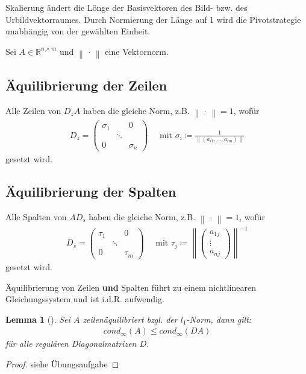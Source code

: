 \documentclass[ngerman,fontsize=11pt, paper=a4, parskip=half, titlepage=true, toc=bib]{scrbook}
\theoremstyle{definition}
\theoremstyle{plain}
\newtheorem{Lem}[Def]{Lemma}		%
\newcommand{\Renm}{\mathds{R}^{n\times m}}
\newcommand{\nn}[1]{\left\| #1 \right\|}
\newcommand{\subsectione}[1]{\subsection{#1} \addtocounter{Def}{1}}
\newenvironment{Leme}[1][]{ %
	\begin{Lem}[#1]
	}
	{
	\end{Lem}
	\addtocounter{subsection}{1}
}
\begin{document}
  Skalierung ändert die Lönge der Basisvektoren des Bild- bzw. des Urbildvektorraumes.
  Durch Normierung der Länge auf 1 wird die Pivotstrategie unabhängig von der 
  gewählten Einheit.
  
  Sei $A\in\Renm $ und $\nn{\,\cdot\,} $ eine Vektornorm.
  
  
  \subsectione{Äquilibrierung der Zeilen} 
  Alle Zeilen von $D_zA$ haben die gleiche Norm, z.B. $\nn{\,\cdot\,} =1$, wofür 
  \begin{gather}
    D_z = \begin{pmatrix}
      \sigma_1 & & 0 \\
      &\ddots & \\ 
      0 && \sigma_n
    \end{pmatrix}
    \quad \text{ mit }\sigma_i\coloneqq \frac{1}{\nn{(a_{i1}, \dots , a_{im})}}
    \label{IV.1.1}
  \end{gather}
  gesetzt wird.


\subsectione{Äquilibrierung der Spalten} 
  Alle Spalten von $AD_s$ haben die gleiche Norm, z.B. $\nn{\,\cdot\,} =1$, wofür 
  \begin{gather}
    D_s = \begin{pmatrix}
      \tau_1 & & 0 \\
      &\ddots & \\ 
      0 && \tau_m
    \end{pmatrix}
    \quad \text{ mit }\tau_j\coloneqq \nn{\begin{pmatrix}
        a_{1j} \\ \vdots \\ a_{nj}
      \end{pmatrix}}^{-1}
    \label{IV.1.2}
  \end{gather}
  gesetzt wird.
  
  Äquilibrierung von Zeilen \textbf{und} Spalten führt zu einem nichtlinearen Gleichungssystem und ist i.d.R. aufwendig.
  
  
  \begin{Leme}
  	\label{4.3.1}
  	Sei $A$ zeilenäquilibriert bzgl. der $l_1$-Norm, dann gilt:
  	\begin{gather}
  	cond_{\infty}(A) \leq cond_{\infty}(DA)  \label{IV.1.3}
  	\end{gather}
  	für alle regulären Diagonalmatrizen $D$.
  \end{Leme} 
  
  \begin{proof}
    siehe Übungsaufgabe
  \end{proof}
\end{document}
